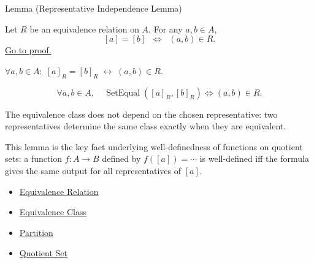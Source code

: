 
\begin{lemmabox}{Lemma (Representative Independence Lemma)}
\begin{lemma}\label{lem:rep-independence}
Let $R$ be an equivalence relation on $A$. For any $a,b \in A$,
\[
[a] = [b]
\;\;\Longleftrightarrow\;\;
(a,b) \in R.
\]
\hyperref[prf:rep-independence]{Go to proof.}
\end{lemma}
\end{lemmabox}

\begin{remark*}
$\forall a, b \in A:\; [a]_R = [b]_R \;\leftrightarrow\; (a,b)\in R$.
\end{remark*}

\begin{remark*}
\[
  \forall a,b\in A,\quad
  \operatorname{SetEqual}([a]_R,[b]_R)
  \iff
  (a,b)\in R.
\]
\end{remark*}

\begin{remark*}[Interpretation]
The equivalence class does not depend on the chosen representative: two
representatives determine the same class exactly when they are equivalent.
\end{remark*}

\begin{remark*}[Exposition]
This lemma is the key fact underlying well-definedness of functions on quotient
sets: a function $f : A \to B$ defined by $f([a]) = \cdots$ is well-defined
iff the formula gives the same output for all representatives of $[a]$.
\end{remark*}

\begin{dependencies}
\begin{itemize}
  \item \hyperref[def:equivalence-rel]{Equivalence Relation}
  \item \hyperref[def:equiv-class]{Equivalence Class}
  \item \hyperref[def:partition]{Partition}
  \item \hyperref[def:quotient-set]{Quotient Set}
\end{itemize}
\end{dependencies}

